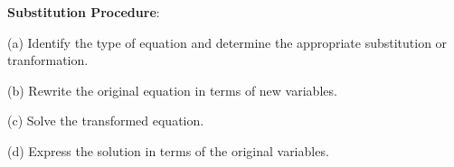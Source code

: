 \nopagenumbers
{\bf Substitution Procedure}: 

\vskip 6pt
(a) Identify the type of equation and determine the appropriate substitution or tranformation.

\vskip 6pt
(b) Rewrite the original equation in terms of new variables.

\vskip 6pt
(c) Solve the transformed equation.

\vskip 6pt
(d) Express the solution in terms of the original variables.

\vfill\eject
\bye
